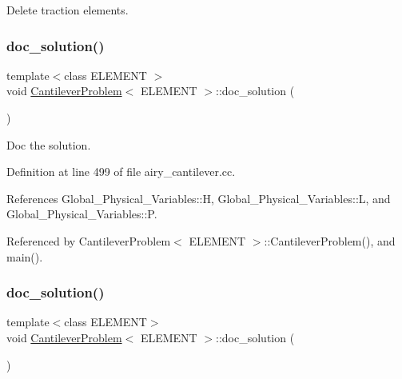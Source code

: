 Delete traction elements. 

\mbox{\label{classCantileverProblem_a7571348f8724e71be4e67dc64cea3877}} 
\subsubsection{\texorpdfstring{doc\+\_\+solution()}{doc\_solution()}\hspace{0.1cm}{\footnotesize\ttfamily [1/2]}}
{\footnotesize\ttfamily template$<$class E\+L\+E\+M\+E\+NT $>$ \\
void \hyperlink{classCantileverProblem}{Cantilever\+Problem}$<$ E\+L\+E\+M\+E\+NT $>$\+::doc\+\_\+solution (\begin{DoxyParamCaption}{ }\end{DoxyParamCaption})}



Doc the solution. 



Definition at line 499 of file airy\+\_\+cantilever.\+cc.



References Global\+\_\+\+Physical\+\_\+\+Variables\+::H, Global\+\_\+\+Physical\+\_\+\+Variables\+::L, and Global\+\_\+\+Physical\+\_\+\+Variables\+::P.



Referenced by Cantilever\+Problem$<$ E\+L\+E\+M\+E\+N\+T $>$\+::\+Cantilever\+Problem(), and main().

\mbox{\label{classCantileverProblem_a7571348f8724e71be4e67dc64cea3877}} 
\subsubsection{\texorpdfstring{doc\+\_\+solution()}{doc\_solution()}\hspace{0.1cm}{\footnotesize\ttfamily [2/2]}}
{\footnotesize\ttfamily template$<$class E\+L\+E\+M\+E\+NT$>$ \\
void \hyperlink{classCantileverProblem}{Cantilever\+Problem}$<$ E\+L\+E\+M\+E\+NT $>$\+::doc\+\_\+solution (\begin{DoxyParamCaption}{ }\end{DoxyParamCaption})}



